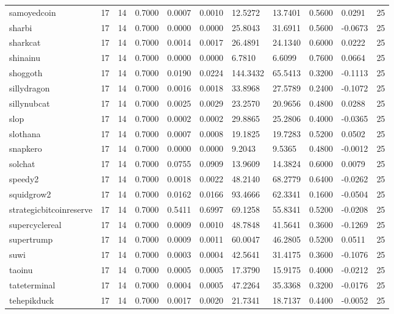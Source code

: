 \begin{table}[htbp]
\begin{tabular}{lllllllllll}
samoyedcoin & 17 & 14 & 0.7000 & 0.0007 & 0.0010 & 12.5272 & 13.7401 & 0.5600 & 0.0291 & 25 \\
sharbi & 17 & 14 & 0.7000 & 0.0000 & 0.0000 & 25.8043 & 31.6911 & 0.5600 & -0.0673 & 25 \\
sharkcat & 17 & 14 & 0.7000 & 0.0014 & 0.0017 & 26.4891 & 24.1340 & 0.6000 & 0.0222 & 25 \\
shinainu & 17 & 14 & 0.7000 & 0.0000 & 0.0000 & 6.7810 & 6.6099 & 0.7600 & 0.0664 & 25 \\
shoggoth & 17 & 14 & 0.7000 & 0.0190 & 0.0224 & 144.3432 & 65.5413 & 0.3200 & -0.1113 & 25 \\
sillydragon & 17 & 14 & 0.7000 & 0.0016 & 0.0018 & 33.8968 & 27.5789 & 0.2400 & -0.1072 & 25 \\
sillynubcat & 17 & 14 & 0.7000 & 0.0025 & 0.0029 & 23.2570 & 20.9656 & 0.4800 & 0.0288 & 25 \\
slop & 17 & 14 & 0.7000 & 0.0002 & 0.0002 & 29.8865 & 25.2806 & 0.4000 & -0.0365 & 25 \\
slothana & 17 & 14 & 0.7000 & 0.0007 & 0.0008 & 19.1825 & 19.7283 & 0.5200 & 0.0502 & 25 \\
snapkero & 17 & 14 & 0.7000 & 0.0000 & 0.0000 & 9.2043 & 9.5365 & 0.4800 & -0.0012 & 25 \\
solchat & 17 & 14 & 0.7000 & 0.0755 & 0.0909 & 13.9609 & 14.3824 & 0.6000 & 0.0079 & 25 \\
speedy2 & 17 & 14 & 0.7000 & 0.0018 & 0.0022 & 48.2140 & 68.2779 & 0.6400 & -0.0262 & 25 \\
squidgrow2 & 17 & 14 & 0.7000 & 0.0162 & 0.0166 & 93.4666 & 62.3341 & 0.1600 & -0.0504 & 25 \\
strategicbitcoinreserve & 17 & 14 & 0.7000 & 0.5411 & 0.6997 & 69.1258 & 55.8341 & 0.5200 & -0.0208 & 25 \\
supercyclereal & 17 & 14 & 0.7000 & 0.0009 & 0.0010 & 48.7848 & 41.5641 & 0.3600 & -0.1269 & 25 \\
supertrump & 17 & 14 & 0.7000 & 0.0009 & 0.0011 & 60.0047 & 46.2805 & 0.5200 & 0.0511 & 25 \\
suwi & 17 & 14 & 0.7000 & 0.0003 & 0.0004 & 42.5641 & 31.4175 & 0.3600 & -0.1076 & 25 \\
taoinu & 17 & 14 & 0.7000 & 0.0005 & 0.0005 & 17.3790 & 15.9175 & 0.4000 & -0.0212 & 25 \\
tateterminal & 17 & 14 & 0.7000 & 0.0004 & 0.0005 & 47.2264 & 35.3368 & 0.3200 & -0.0176 & 25 \\
tehepikduck & 17 & 14 & 0.7000 & 0.0017 & 0.0020 & 21.7341 & 18.7137 & 0.4400 & -0.0052 & 25 \\

\end{tabular}
\end{table}
